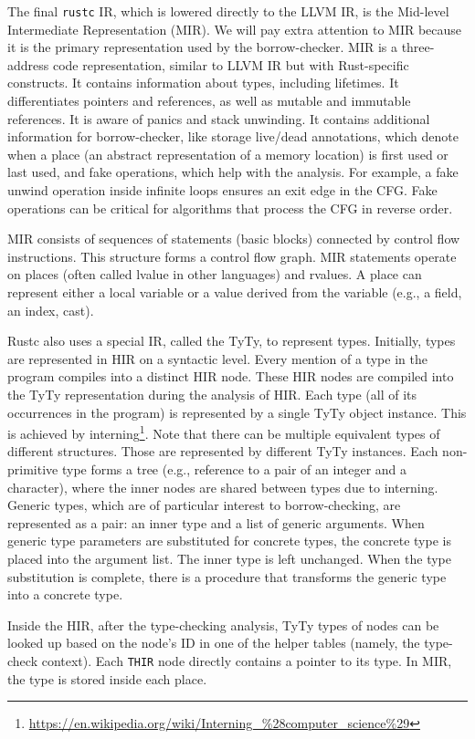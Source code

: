 \documentclass[
  11pt,
]{report}
\DeclareRobustCommand{\href}[2]{#2\footnote{\url{#1}}}
\begin{document}
The final \texttt{rustc} IR, which is lowered directly to the LLVM IR,
is the Mid-level Intermediate Representation (MIR). We will pay extra
attention to MIR because it is the primary representation used by the
borrow-checker. MIR is a three-address code representation, similar to
LLVM IR but with Rust-specific constructs. It contains information about
types, including lifetimes. It differentiates pointers and references,
as well as mutable and immutable references. It is aware of panics and
stack unwinding. It contains additional information for borrow-checker,
like storage live/dead annotations, which denote when a place (an
abstract representation of a memory location) is first used or last
used, and fake operations, which help with the analysis. For example, a
fake unwind operation inside infinite loops ensures an exit edge in the
CFG. Fake operations can be critical for algorithms that process the CFG
in reverse order.

MIR consists of sequences of statements (basic blocks) connected by
control flow instructions. This structure forms a control flow graph.
MIR statements operate on places (often called lvalue in other
languages) and rvalues. A place can represent either a local variable or
a value derived from the variable (e.g., a field, an index, cast).

Rustc also uses a special IR, called the TyTy, to represent types.
Initially, types are represented in HIR on a syntactic level. Every
mention of a type in the program compiles into a distinct HIR node.
These HIR nodes are compiled into the TyTy representation during the
analysis of HIR. Each type (all of its occurrences in the program) is
represented by a single TyTy object instance. This is achieved by
\href{https://en.wikipedia.org/wiki/Interning_\%28computer_science\%29}{interning}.
Note that there can be multiple equivalent types of different
structures. Those are represented by different TyTy instances. Each
non-primitive type forms a tree (e.g., reference to a pair of an integer
and a character), where the inner nodes are shared between types due to
interning. Generic types, which are of particular interest to
borrow-checking, are represented as a pair: an inner type and a list of
generic arguments. When generic type parameters are substituted for
concrete types, the concrete type is placed into the argument list. The
inner type is left unchanged. When the type substitution is complete,
there is a procedure that transforms the generic type into a concrete
type.

Inside the HIR, after the type-checking analysis, TyTy types of nodes
can be looked up based on the node's ID in one of the helper tables
(namely, the type-check context). Each \texttt{THIR} node directly
contains a pointer to its type. In MIR, the type is stored inside each
place.
\end{document}
